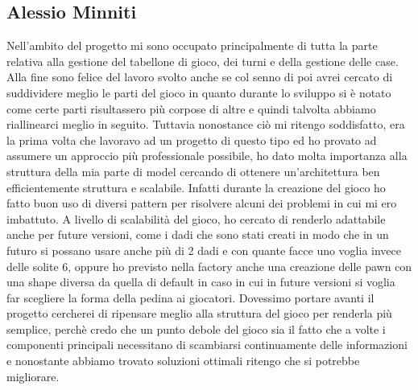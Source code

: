 \subsection{Alessio Minniti}

Nell'ambito del progetto mi sono occupato principalmente di tutta la parte relativa alla gestione del tabellone di gioco, dei turni e della gestione delle case. 
Alla fine sono felice del lavoro svolto anche se col senno di poi avrei cercato di suddividere meglio le parti del gioco 
in quanto durante lo sviluppo si è notato come certe parti risultassero più corpose di altre e quindi talvolta abbiamo riallinearci meglio in seguito.
Tuttavia nonostance ciò mi ritengo soddisfatto, era la prima volta che lavoravo ad un progetto di questo tipo ed ho provato ad assumere un approccio più professionale possibile,
ho dato molta importanza alla struttura della mia parte di model cercando di ottenere un'architettura ben efficientemente struttura e scalabile.
Infatti durante la creazione del gioco ho fatto buon uso di diversi pattern per risolvere alcuni dei problemi in cui mi ero imbattuto.  
A livello di scalabilità del gioco, ho cercato di renderlo adattabile anche per future versioni, come i dadi che sono stati creati in modo che in un futuro 
si possano usare anche più di 2 dadi e con quante facce uno voglia invece delle solite 6, 
oppure ho previsto nella factory anche una creazione delle pawn con una shape diversa da quella di default in caso in cui 
in future versioni si voglia far scegliere la forma della pedina ai giocatori.
Dovessimo portare avanti il progetto cercherei di ripensare meglio alla struttura del gioco per renderla più semplice, perchè credo che un punto debole del gioco
sia il fatto che a volte i componenti principali necessitano di scambiarsi continuamente delle informazioni e nonostante abbiamo trovato soluzioni ottimali
ritengo che si potrebbe migliorare.